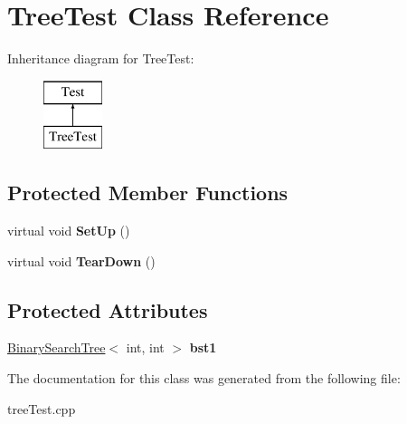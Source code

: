 \hypertarget{classTreeTest}{\section{Tree\-Test Class Reference}
\label{classTreeTest}
}
Inheritance diagram for Tree\-Test\-:\begin{figure}[H]
\begin{center}
\leavevmode
\includegraphics[height=2.000000cm]{classTreeTest}
\end{center}
\end{figure}
\subsection*{Protected Member Functions}
\begin{DoxyCompactItemize}
\item 
\hypertarget{classTreeTest_a50caa23d3a9be5549c5b26fe78412602}{virtual void {\bfseries Set\-Up} ()}\label{classTreeTest_a50caa23d3a9be5549c5b26fe78412602}

\item 
\hypertarget{classTreeTest_af62231881288188320962c123d9c1629}{virtual void {\bfseries Tear\-Down} ()}\label{classTreeTest_af62231881288188320962c123d9c1629}

\end{DoxyCompactItemize}
\subsection*{Protected Attributes}
\begin{DoxyCompactItemize}
\item 
\hypertarget{classTreeTest_aaba2ba8609158514d6aad8f2df60a448}{\hyperlink{classBinarySearchTree}{Binary\-Search\-Tree}$<$ int, int $>$ {\bfseries bst1}}\label{classTreeTest_aaba2ba8609158514d6aad8f2df60a448}

\end{DoxyCompactItemize}


The documentation for this class was generated from the following file\-:\begin{DoxyCompactItemize}
\item 
tree\-Test.\-cpp\end{DoxyCompactItemize}
